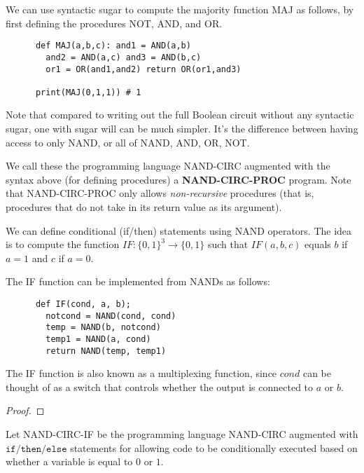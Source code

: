   \begin{example}
    We can use syntactic sugar to compute the majority function MAJ as follows, by first defining the procedures NOT, AND, and OR. 
    \begin{lstlisting}
      def MAJ(a,b,c): and1 = AND(a,b)
        and2 = AND(a,c) and3 = AND(b,c)
        or1 = OR(and1,and2) return OR(or1,and3)

      print(MAJ(0,1,1)) # 1
    \end{lstlisting}
  \end{example}

  Note that compared to writing out the full Boolean circuit without any syntactic sugar, one with sugar will can be much simpler. It's the difference between having access to only NAND, or all of NAND, AND, OR, NOT. 

  \begin{definition}
    We call these the programming language NAND-CIRC augmented with the syntax above (for defining procedures) a \textbf{NAND-CIRC-PROC} program. Note that NAND-CIRC-PROC only allows \textit{non-recursive} procedures (that is, procedures that do not take in its return value as its argument). 
  \end{definition}

  We can define conditional (if/then) statements using NAND operators. The idea is to compute the function $IF: \{0,1\}^3 \longrightarrow \{0,1\}$ such that $IF(a, b, c)$ equals $b$ if $a = 1$ and $c$ if $a = 0$. 

  \begin{definition}
    The IF function can be implemented from NANDs as follows: 
    \begin{lstlisting}
      def IF(cond, a, b);
        notcond = NAND(cond, cond) 
        temp = NAND(b, notcond)
        temp1 = NAND(a, cond)
        return NAND(temp, temp1)
    \end{lstlisting}
    The IF function is also known as a multiplexing function, since $cond$ can be thought of as a switch that controls whether the output is connected to $a$ or $b$. 
  \end{definition}
  \begin{proof}
    
  \end{proof}

  \begin{definition}
    Let NAND-CIRC-IF be the programming language NAND-CIRC augmented with $\texttt{if/then/else}$ statements for allowing code to be conditionally executed based on whether a variable is equal to $0$ or $1$. 
  \end{definition}

